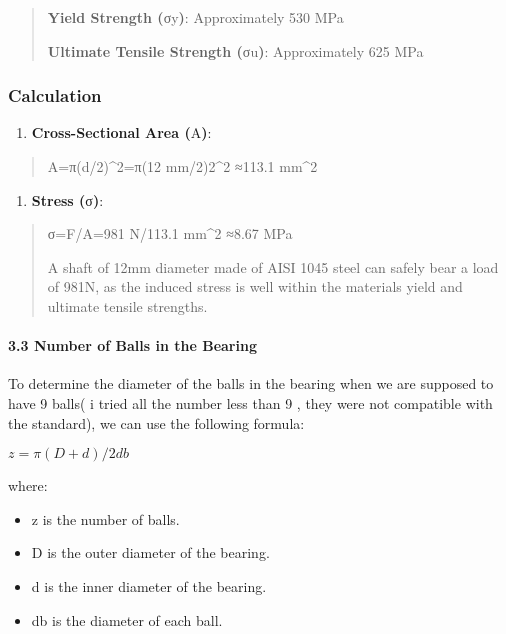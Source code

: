 \documentclass[../../main]{subfiles}
\begin{document}
\begin{quote}
\textbf{Yield Strength (}σy\textbf{)}: Approximately 530 MPa

\textbf{Ultimate Tensile Strength (}σu\textbf{)}: Approximately 625 MPa
\end{quote}

\subsubsection{\texorpdfstring{\textbf{Calculation}}{Calculation}}\label{calculation}

\begin{enumerate}
\def\labelenumi{\arabic{enumi}.}
\item
  \textbf{Cross-Sectional Area (}A\textbf{)}:
\end{enumerate}

\begin{quote}
A=π(d/2)\^{}2=π(12 mm/2)2\^{}2 ≈113.1 mm\^{}2
\end{quote}

\begin{enumerate}
\def\labelenumi{\arabic{enumi}.}
\setcounter{enumi}{1}
\item
  \textbf{Stress (}σ\textbf{)}:
\end{enumerate}

\begin{quote}
σ=F/A=981 N/113.1 mm\^{}2 ≈8.67 MPa

A shaft of 12mm diameter made of AISI 1045 steel can safely bear a load
of 981N, as the induced stress is well within the
material\textquotesingle s yield and ultimate tensile strengths.
\end{quote}

\paragraph{\texorpdfstring{\textbf{3.3 Number of Balls in the
Bearing}}{3.3 Number of Balls in the Bearing}}\label{number-of-balls-in-the-bearing}

To determine the diameter of the balls in the bearing when we are
supposed to have 9 balls( i tried all the number less than 9 , they were
not compatible with the standard), we can use the following formula:

\(z = \pi(D + d)/2db\)

where:

\begin{itemize}
\item
  z is the number of balls.
\item
  D is the outer diameter of the bearing.
\item
  d is the inner diameter of the bearing.
\item
  db is the diameter of each ball.
\end{itemize}
\end{document}
